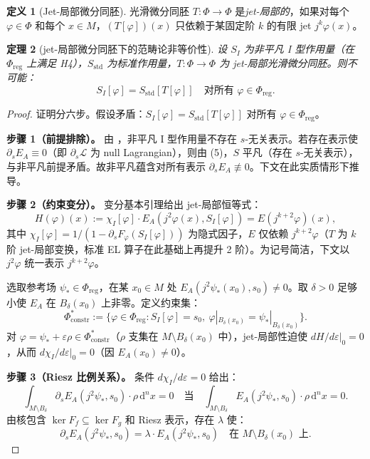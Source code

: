 \documentclass[12pt,a4paper]{article}
\newtheorem{theorem}{定理}[section]
\theoremstyle{definition}
\newtheorem{definition}[theorem]{定义}
\newcommand{\mL}{\mathcal{L}}
\newcommand{\mPhi}{\Phi}
\newcommand{\mreg}{\mPhi_{\mathrm{reg}}}
\newcommand{\diff}{\mathrm{d}}
\newcommand{\eps}{\varepsilon}
\newcommand{\chiI}{\chi_I}
\newcommand{\EA}{E_A}
\newcommand{\jphi}{j^2\varphi}
\newcommand{\dVol}{\,\diff^n x}
\begin{document}
\begin{definition}[Jet-局部微分同胚]
光滑微分同胚 $T: \mPhi \to \mPhi$ 是\emph{jet-局部的}，如果对每个 $\varphi \in \mPhi$ 和每个 $x \in M$，$(T[\varphi])(x)$ 只依赖于某固定阶 $k$ 的有限 jet $j^k\varphi(x)$。
\end{definition}

\begin{theorem}[jet-局部微分同胚下的范畴论非等价性]
\label{thm:p14d}
设 $S_I$ 为非平凡 I 型作用量（在 $\mreg$ 上满足 H4），$S_{\mathrm{std}}$ 为标准作用量，$T: \mPhi \to \mPhi$ 为 jet-局部光滑微分同胚。则\emph{不可能}：
\[ S_I[\varphi] = S_{\mathrm{std}}[T[\varphi]] \quad \text{对所有 } \varphi \in \mreg. \]
\end{theorem}

\begin{proof}
证明分六步。假设矛盾：$S_I[\varphi] = S_{\mathrm{std}}[T[\varphi]]$ 对所有 $\varphi \in \mreg$。

\textbf{步骤 1（前提排除）。} 由 ，非平凡 I 型作用量不存在 $s$-无关表示。若存在表示使 $\partial_s E_A \equiv 0$（即 $\partial_s \mL$ 为 null Lagrangian），则由  (5)，$S$ 平凡（存在 $s$-无关表示），与非平凡前提矛盾。故非平凡蕴含对所有表示 $\partial_s E_A \not\equiv 0$。下文在此实质情形下推导。

\textbf{步骤 2（约束变分）。} 变分基本引理给出 jet-局部恒等式：
\begin{equation}
H(\varphi)(x) := \chiI[\varphi] \cdot \EA(\jphi(x), S_I[\varphi]) = E(j^{k+2}\varphi)(x),
\label{eq:jet-local-claim}
\end{equation}
其中 $\chiI[\varphi] = 1/(1 - \partial_s F_\varphi(S_I[\varphi]))$ 为隐式因子，$E$ 仅依赖 $j^{k+2}\varphi$（$T$ 为 $k$ 阶 jet-局部变换，标准 EL 算子在此基础上再提升 2 阶）。为记号简洁，下文以 $\jphi$ 统一表示 $j^{k+2}\varphi$。

选取参考场 $\psi_* \in \mreg$，在某 $x_0 \in M$ 处 $\EA(j^2\psi_*(x_0), s_0) \neq 0$。取 $\delta > 0$ 足够小使 $\EA$ 在 $B_\delta(x_0)$ 上非零。定义约束集：
\[ \Phi^*_{\mathrm{constr}} := \{\varphi \in \mreg : S_I[\varphi] = s_0,\ \varphi|_{B_\delta(x_0)} = \psi_*|_{B_\delta(x_0)}\}. \]
对 $\varphi = \psi_* + \eps\rho \in \Phi^*_{\mathrm{constr}}$（$\rho$ 支集在 $M \setminus B_\delta(x_0)$ 中），jet-局部性迫使 $dH/d\eps|_0 = 0$，从而 $d\chiI/d\eps|_0 = 0$（因 $\EA(x_0) \neq 0$）。

\textbf{步骤 3（Riesz 比例关系）。} 条件 $d\chiI/d\eps = 0$ 给出：
\[ \int_{M \setminus B_\delta} \partial_s \EA(j^2\psi_*, s_0) \cdot \rho \dVol = 0 \quad \text{当} \quad \int_{M \setminus B_\delta} \EA(j^2\psi_*, s_0) \cdot \rho \dVol = 0. \]
由核包含 $\ker F_f \subseteq \ker F_g$ 和 Riesz 表示，存在 $\lambda$ 使：
\begin{equation}
\partial_s \EA(j^2\psi_*, s_0) = \lambda \cdot \EA(j^2\psi_*, s_0) \quad \text{在 } M \setminus B_\delta(x_0) \text{ 上}.
\label{eq:proportionality-local}
\end{equation}


\end{proof}
\end{document}
